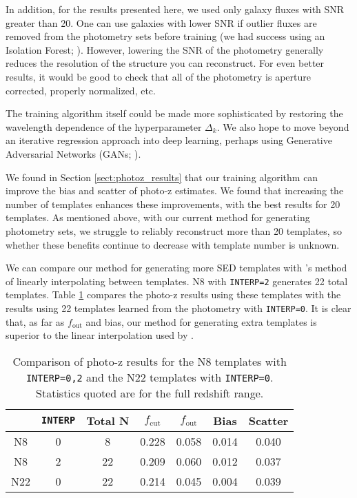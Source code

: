 In addition, for the results presented here, we used only galaxy fluxes with SNR greater than 20.
One can use galaxies with lower SNR if outlier fluxes are removed from the photometry sets before training (we had success using an Isolation Forest; \citealt{Ting2008,Liu2012}).
However, lowering the SNR of the photometry generally reduces the resolution of the structure you can reconstruct.
For even better results, it would be good to check that all of the photometry is aperture corrected, properly normalized, etc.

The training algorithm itself could be made more sophisticated by restoring the wavelength dependence of the hyperparameter $\Delta_k$.
We also hope to move beyond an iterative regression approach into deep learning, perhaps using Generative Adversarial Networks (GANs; \citealt{Goodfellow2014}).

We found in Section \ref{sect:photoz_results} that our training algorithm can improve the bias and scatter of photo-z estimates.
We found that increasing the number of templates enhances these improvements, with the best results for 20 templates.
As mentioned above, with our current method for generating photometry sets, we struggle to reliably reconstruct more than 20 templates, so whether these benefits continue to decrease with template number is unknown.

We can compare our method for generating more SED templates with \bpz's method of linearly interpolating between templates.
N8 with \texttt{INTERP=2} generates 22 total templates.
Table \ref{tab:interp_comparison} compares the photo-z results using these templates with the results using 22 templates learned from the photometry with \texttt{INTERP=0}.
It is clear that, as far as $f_\text{out}$ and bias, our method for generating extra templates is superior to the linear interpolation used by \bpz. 

\begin{table}[h]
    \caption{Comparison of photo-z results for the N8 templates with \texttt{INTERP=0,2} and the N22 templates with \texttt{INTERP=0}. Statistics quoted are for the full redshift range.}
    \label{tab:interp_comparison}
    \centering
    \begin{tabular}{c c c c c c c}
        \hline \hline
        & \texttt{INTERP} & Total N & $f_\text{cut}$ & $f_\text{out}$ & Bias & Scatter \\
        \hline

        N8  & 0 &  8 & 0.228 & 0.058 & 0.014 & 0.040 \\
        N8  & 2 & 22 & 0.209 & 0.060 & 0.012 & 0.037 \\
        N22 & 0 & 22 & 0.214 & 0.045 & 0.004 & 0.039 \\

        \hline
    \end{tabular}
\end{table}

